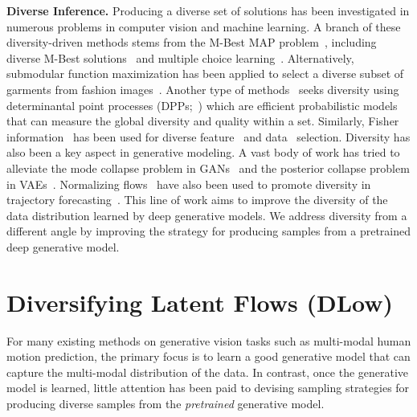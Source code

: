\documentclass[runningheads]{llncs}
\begin{document}
	\vspace{1pt}
	\noindent\textbf{Diverse Inference.} Producing a diverse set of solutions has been investigated in numerous problems in computer vision and machine learning. A branch of these diversity-driven methods stems from the M-Best MAP problem~\cite{nilsson1998efficient,seroussi1994algorithm}, including diverse M-Best solutions~\cite{batra2012diverse} and multiple choice learning~\cite{guzman2012multiple,lee2016stochastic}. Alternatively, submodular function maximization has been applied to select a diverse subset of garments from fashion images~\cite{hsiao2018creating}. Another type of methods~\cite{kulesza2011k,gong2014diverse,gillenwater2014expectation,huang2015we,azadi2017learning,yuan2019diverse,WengYuan2020} seeks diversity using determinantal point processes (DPPs;~\cite{macchi1975coincidence,kulesza2012determinantal}) which are efficient probabilistic models that can measure the global diversity and quality within a set. Similarly, Fisher information~\cite{rissanen1996fisher} has been used for diverse feature~\cite{gu2012generalized} and data~\cite{sourati2017probabilistic} selection. Diversity has also been a key aspect in generative modeling. A vast body of work has tried to alleviate the mode collapse problem in GANs~\cite{che2016mode,chen2016infogan,srivastava2017veegan,arjovsky2017wasserstein,gulrajani2017improved,elfeki2018gdpp,lin2018pacgan,yang2019diversity} and the posterior collapse problem in VAEs~\cite{zhao2017infovae,tolstikhin2017wasserstein,kim2018semi,bhattacharyya2018accurate,liu2019cyclical,he2019lagging}. Normalizing flows~\cite{rezende2015variational} have also been used to promote diversity in trajectory forecasting~\cite{rhinehart2018r2p2,guan2020generative}. This line of work aims to improve the diversity of the data distribution learned by deep generative models. We address diversity from a different angle by improving the strategy for producing samples from a pretrained deep generative model. 
	\vspace{-2mm}
	\section{Diversifying Latent Flows (DLow)}
	\label{sec:dlow}
	\vspace{-5pt}
	
	For many existing methods on generative vision tasks such as multi-modal human motion prediction, the primary focus is to learn a good generative model that can capture the multi-modal distribution of the data. In contrast, once the generative model is learned, little attention has been paid to devising sampling strategies for producing diverse samples from the \emph{pretrained} generative model.
	
\end{document}
